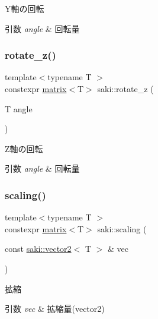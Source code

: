 Y軸の回転 


\begin{DoxyParams}{引数}
{\em angle} & 回転量 \\
\hline
\end{DoxyParams}
\mbox{\label{namespacesaki_a0dcbd0c8e630d947ba6f0c6e0875d552}} 
\subsubsection{\texorpdfstring{rotate\+\_\+z()}{rotate\_z()}}
{\footnotesize\ttfamily template$<$typename T $>$ \\
constexpr \mbox{\hyperlink{classsaki_1_1matrix}{matrix}}$<$T$>$ saki\+::rotate\+\_\+z (\begin{DoxyParamCaption}\item[{T}]{angle }\end{DoxyParamCaption})}



Z軸の回転 


\begin{DoxyParams}{引数}
{\em angle} & 回転量 \\
\hline
\end{DoxyParams}
\mbox{\label{namespacesaki_abda5ab30bf4dc9240857d62d56e590f9}} 
\subsubsection{\texorpdfstring{scaling()}{scaling()}\hspace{0.1cm}{\footnotesize\ttfamily [1/3]}}
{\footnotesize\ttfamily template$<$typename T $>$ \\
constexpr \mbox{\hyperlink{classsaki_1_1matrix}{matrix}}$<$T$>$ saki\+::scaling (\begin{DoxyParamCaption}\item[{const \mbox{\hyperlink{classsaki_1_1vector2}{saki\+::vector2}}$<$ T $>$ \&}]{vec }\end{DoxyParamCaption})}



拡縮 


\begin{DoxyParams}{引数}
{\em vec} & 拡縮量(vector2) \\
\hline
\end{DoxyParams}
\mbox{\label{namespacesaki_affcd920fe27abc17e5fa50f04bfabe05}} 
